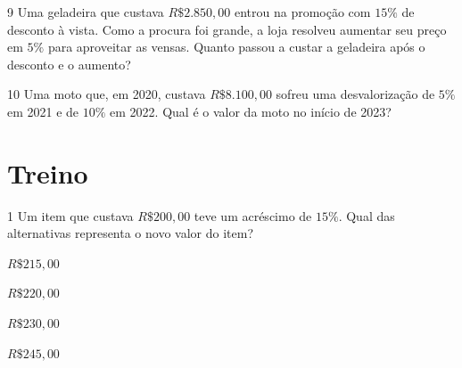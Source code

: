 \num{9} Uma geladeira que custava $R\$2.850,00$ entrou na promoção com $15\%$ de
desconto à vista. Como a procura foi grande, a loja resolveu aumentar
seu preço em $5\%$ para aproveitar as vensas. Quanto passou a custar a
geladeira após o desconto e o aumento?


\num{10} Uma moto que, em 2020, custava $R\$8.100,00$ sofreu uma desvalorização
de $5\%$ em 2021 e de $10\%$ em 2022. Qual é o valor da moto no início de
2023?


\section{Treino}

\num{1} Um item que custava $R\$200,00$ teve um acréscimo de $15\%$. Qual das
alternativas representa o novo valor do item?

\begin{escolha}
  \item $R\$ 215,00$
  \item $R\$ 220,00$
  \item $R\$ 230,00$
  \item $R\$ 245,00$
\end{escolha}


